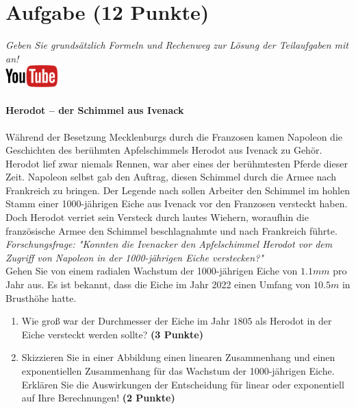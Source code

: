 \documentclass[a4paper, 10pt]{scrartcl}\usepackage[]{graphicx}\usepackage[]{xcolor}
\begin{document}
\section{Aufgabe \hfill (12 Punkte)}

\textit{Geben Sie grunds{\"a}tzlich Formeln und Rechenweg zur L{\"o}sung der
  Teilaufgaben mit an!} \\[1Ex]

\hfill\href{https://youtu.be/Fu8kN0Uj13Y}{\includegraphics[width =
  2cm]{img/youtube}} %
\hspace{2Ex}

\paragraph{Herodot – der Schimmel aus Ivenack}

W{\"a}hrend der Besetzung Mecklenburgs durch die Franzosen kamen Napoleon die
Geschichten des ber{\"u}hmten Apfelschimmels Herodot aus Ivenack zu
Geh{\"o}r. Herodot lief zwar niemals Rennen, war aber eines der ber{\"u}hmtesten
Pferde dieser Zeit. Napoleon selbst gab den Auftrag, diesen
Schimmel durch die Armee nach Frankreich zu bringen. Der Legende nach
sollen Arbeiter den Schimmel im hohlen Stamm einer 1000-j{\"a}hrigen Eiche aus Ivenack vor
den Franzosen versteckt haben. Doch Herodot verriet sein Versteck durch
lautes Wiehern, woraufhin die franz{\"o}sische Armee den Schimmel
beschlagnahmte und nach Frankreich f{\"u}hrte. \\



\textit{Forschungsfrage: "Konnten die Ivenacker den Apfelschimmel Herodot
  vor dem Zugriff von Napoleon in der 1000-j{\"a}hrigen Eiche verstecken?"} \\

Gehen Sie von einem radialen Wachstum der 1000-j{\"a}hrigen Eiche von
$1.1mm$ pro Jahr aus. Es ist bekannt, dass die Eiche im
Jahr 2022 einen Umfang von $10.5m$ in Brusth{\"o}he hatte.

\begin{enumerate}
\item Wie gro{\ss} war der Durchmesser der Eiche im Jahr $1805$ als
  Herodot in der Eiche versteckt werden sollte?
  \textbf{(3 Punkte)}
\item Skizzieren Sie in einer Abbildung einen linearen Zusammenhang und einen
exponentiellen Zusammenhang f{\"u}r das Wachstum der 1000-j{\"a}hrigen Eiche. Erkl{\"a}ren Sie die
Auswirkungen der Entscheidung f{\"u}r linear oder exponentiell auf Ihre
Berechnungen! \textbf{(2 Punkte)}
\end{enumerate}
 
\end{document}
